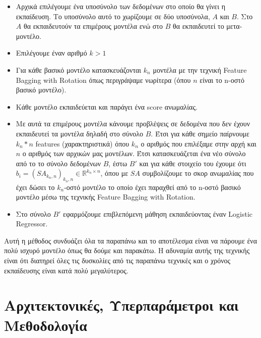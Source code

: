 \documentclass[a4paper,12pt]{report}
\theoremstyle{definitionNODot}
\begin{document}
	\begin{itemize}
		\item Αρχικά επιλέγουμε ένα υποσύνολο των δεδομένων στο οποίο θα γίνει η εκπαίδευση. Το υποσύνολο αυτό το χωρίζουμε σε δύο υποσύνολα, $A$ και $B$. Στο $A$ θα εκπαιδευτούν τα επιμέρους μοντέλα ενώ στο $B$ θα εκπαιδευτεί το μετα-μοντέλο.
		\item Επιλέγουμε έναν αριθμό $k>1$
		\item Για κάθε βασικό μοντέλο κατασκευάζονται $k_n$ μοντέλα με την τεχνική Feature Bagging with Rotation όπως περιγράψαμε νωρίτερα (όπου $n$ είναι το n-οστό βασικό μοντέλο).
		\item Κάθε μοντέλο εκπαιδεύεται και παράγει ένα score ανωμαλίας.
		\item Με αυτά τα επιμέρους μοντέλα κάνουμε προβλέψεις σε δεδομένα που δεν έχουν εκπαιδευτεί τα μοντέλα δηλαδή στο σύνολο $B$. Έτσι για κάθε σημείο παίρνουμε $k_n*n$ features (χαρακτηριστικά) όπου $k_n$ ο αριθμός που επιλέξαμε στην αρχή και $n$ ο αριθμός των αρχικών μας μοντέλων. Έτσι κατασκευάζεται ένα νέο σύνολο από το το σύνολο δεδομένων $B$, έστω $B'$ και για κάθε στοιχείο του έχουμε ότι $b_i = (SA_{k_n,n})_{k_n,n} \in \mathbb{R}^{k_n \times n}$, όπου με $SA$ συμβολίζουμε το σκορ ανωμαλίας που έχει δώσει το $k_n$-οστό μοντέλο το οποίο έχει παραχθεί από το n-οστό βασικό μοντέλο μέσω της τεχνικής Feature Bagging with Rotation.
		\item Στο σύνολο $B'$ εφαρμόζουμε επιβλεπόμενη μάθηση εκπαιδεύοντας έναν Logistic Regressor.
	\end{itemize}
	Αυτή η μέθοδος συνδυάζει όλα τα παραπάνω και το αποτέλεσμα είναι να πάρουμε ένα πολύ ισχυρό μοντέλο όπως θα δούμε και παρακάτω. Η αδυναμία αυτής της τεχνικής είναι ότι διατηρεί όλες τις δυσκολίες από τις παραπάνω τεχνικές και ο χρόνος εκπαίδευσης είναι κατά πολύ μεγαλύτερος.
	
	\section{Αρχιτεκτονικές, Υπερπαράμετροι και Μεθοδολογία}
	
\end{document}
